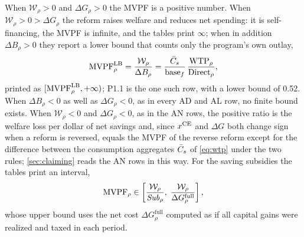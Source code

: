 When $\mathcal{W}_{\rho}>0$ and $\Delta G_{\rho}>0$ the MVPF is a positive number. When $\mathcal{W}_{\rho}>0>\Delta G_{\rho}$ the reform raises welfare and reduces net spending: it is self-financing, the MVPF is infinite, and the tables print $\infty$; when in addition $\Delta B_{\rho}>0$ they report a lower bound that counts only the program's own outlay,
\begin{equation}\label{eq:mvpflb}
\operatorname{MVPF}^{\mathrm{LB}}_{\rho}=\frac{\mathcal{W}_{\rho}}{\Delta B_{\rho}}=\frac{\bar{C}_{s}}{\text{base}_f}\,\frac{\operatorname{WTP}_{\rho}}{\text{Direct}_{\rho}},
\end{equation}
printed as $[\operatorname{MVPF}^{\mathrm{LB}}_{\rho},+\infty)$; P1.1 is the one such row, with a lower bound of 0.52.
When $\Delta B_{\rho}<0$ as well as $\Delta G_{\rho}<0$, as in every AD and AL row, no finite bound exists.
When $\mathcal{W}_{\rho}<0$ and $\Delta G_{\rho}<0$, as in the AN rows, the positive ratio is the welfare loss per dollar of net savings and, since $x^{\mathrm{CE}}$ and $\Delta G$ both change sign when a reform is reversed, equals the MVPF of the reverse reform except for the difference between the consumption aggregates $\bar{C}_{s}$ of \eqref{eq:wtp} under the two rules; \autoref{sec:claiming} reads the AN rows in this way.
For the saving subsidies the tables print an interval,
\begin{equation}\label{eq:mvpfk}
\operatorname{MVPF}_{\rho}\in\left[\frac{\mathcal{W}_{\rho}}{\mathit{Sub}_{\rho}},\;\frac{\mathcal{W}_{\rho}}{\Delta G^{\mathrm{full}}_{\rho}}\right],
\end{equation}
whose upper bound uses the net cost $\Delta G^{\mathrm{full}}_{\rho}$ computed as if all capital gains were realized and taxed in each period.

